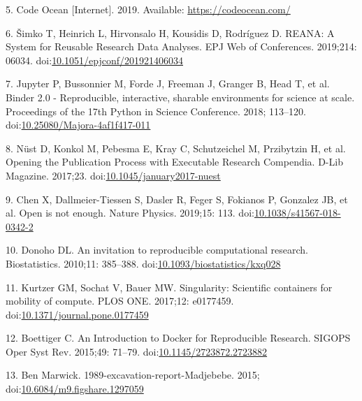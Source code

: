 \documentclass[10pt,letterpaper]{article}
\begin{document}
\leavevmode\hypertarget{ref-code_ocean_2019}{}%
5. Code Ocean {[}Internet{]}. 2019. Available:
\url{https://codeocean.com/}

\leavevmode\hypertarget{ref-simko_reana_2019}{}%
6. Šimko T, Heinrich L, Hirvonsalo H, Kousidis D, Rodríguez D. REANA: A
System for Reusable Research Data Analyses. EPJ Web of Conferences.
2019;214: 06034.
doi:\href{https://doi.org/10.1051/epjconf/201921406034}{10.1051/epjconf/201921406034}

\leavevmode\hypertarget{ref-jupyter_binder_2018}{}%
7. Jupyter P, Bussonnier M, Forde J, Freeman J, Granger B, Head T, et
al. Binder 2.0 - Reproducible, interactive, sharable environments for
science at scale. Proceedings of the 17th Python in Science Conference.
2018; 113--120.
doi:\href{https://doi.org/10.25080/Majora-4af1f417-011}{10.25080/Majora-4af1f417-011}

\leavevmode\hypertarget{ref-nust_opening_2017}{}%
8. Nüst D, Konkol M, Pebesma E, Kray C, Schutzeichel M, Przibytzin H, et
al. Opening the Publication Process with Executable Research Compendia.
D-Lib Magazine. 2017;23.
doi:\href{https://doi.org/10.1045/january2017-nuest}{10.1045/january2017-nuest}

\leavevmode\hypertarget{ref-chen_open_2019}{}%
9. Chen X, Dallmeier-Tiessen S, Dasler R, Feger S, Fokianos P, Gonzalez
JB, et al. Open is not enough. Nature Physics. 2019;15: 113.
doi:\href{https://doi.org/10.1038/s41567-018-0342-2}{10.1038/s41567-018-0342-2}

\leavevmode\hypertarget{ref-donoho_invitation_2010}{}%
10. Donoho DL. An invitation to reproducible computational research.
Biostatistics. 2010;11: 385--388.
doi:\href{https://doi.org/10.1093/biostatistics/kxq028}{10.1093/biostatistics/kxq028}

\leavevmode\hypertarget{ref-kurtzer_singularity_2017}{}%
11. Kurtzer GM, Sochat V, Bauer MW. Singularity: Scientific containers
for mobility of compute. PLOS ONE. 2017;12: e0177459.
doi:\href{https://doi.org/10.1371/journal.pone.0177459}{10.1371/journal.pone.0177459}

\leavevmode\hypertarget{ref-boettiger_introduction_2015}{}%
12. Boettiger C. An Introduction to Docker for Reproducible Research.
SIGOPS Oper Syst Rev. 2015;49: 71--79.
doi:\href{https://doi.org/10.1145/2723872.2723882}{10.1145/2723872.2723882}

\leavevmode\hypertarget{ref-marwick_madjebebe_2015}{}%
13. Ben Marwick. 1989-excavation-report-Madjebebe. 2015;
doi:\href{https://doi.org/10.6084/m9.figshare.1297059}{10.6084/m9.figshare.1297059}
\end{document}
